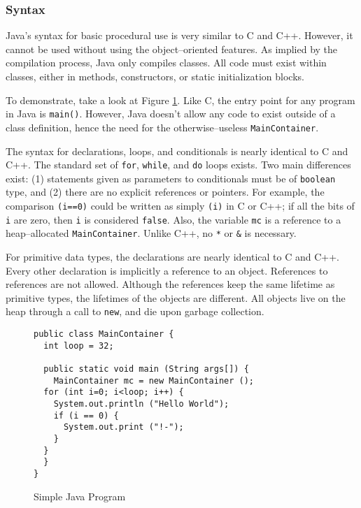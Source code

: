 
\subsubsection{Syntax}
  Java's syntax for basic procedural use is very similar to C and C++.  However, it cannot be used without using the object--oriented features.  As implied by the compilation process, Java only compiles classes.  All code must exist within classes, either in methods, constructors, or static initialization blocks.

	To demonstrate, take a look at Figure \ref{fig:java-simple}.  Like C, the entry point for any program in Java is \texttt{main()}.  However, Java doesn't allow any code to exist outside of a class definition, hence the need for the otherwise--useless  \texttt{MainContainer}.  

  The syntax for declarations, loops, and conditionals is nearly identical to C and C++.  The standard set of \texttt{for}, \texttt{while}, and \texttt{do} loops exists.  Two main differences exist: (1) statements given as parameters to conditionals must be of \texttt{boolean} type, and (2) there are no explicit references or pointers.  For example, the comparison \texttt{(i==0)} could be written as simply \texttt{(i)} in C or C++; if all the bits of \texttt{i} are zero, then \texttt{i} is considered \texttt{false}.  Also, the variable \texttt{mc} is a reference to a heap--allocated \texttt{MainContainer}.  Unlike C++, no \texttt{*} or \texttt{\&} is necessary.

  For primitive data types, the declarations are nearly identical to C and C++.  Every other declaration is implicitly a reference to an object.  References to references are not allowed.  Although the references keep the same lifetime as primitive types, the lifetimes of the objects are different.  All objects live on the heap through a call to \texttt{new}, and die upon garbage collection.

\begin{figure}[ht!]
\begin{verbatim}
public class MainContainer {
  int loop = 32;
  
  public static void main (String args[]) {
    MainContainer mc = new MainContainer ();
  for (int i=0; i<loop; i++) {
    System.out.println ("Hello World");
    if (i == 0) {
      System.out.print ("!-");
    }
  }
  }
}
\end{verbatim}
\caption{Simple Java Program}
\label{fig:java-simple}
\end{figure}

